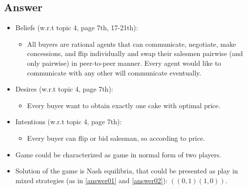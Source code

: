 \documentclass[
	a4paper, %
	11pt, %
]{CSUniSchoolLabReport}
\begin{document}
\subsection{Answer}\label{answer03}
\begin{itemize}
    \item Beliefs (w.r.t topic 4, page 7th, 17-21th):
    \begin{itemize}
        \item All buyers are rational agents that can communicate, negotiate, make concessions, and flip individually and swap their salesmen pairwise (and only pairwise) in peer-to-peer manner. Every agent would like to communicate with any other will communicate eventually.
    \end{itemize}
    \item Desires (w.r.t topic 4, page 7th):
    \begin{itemize}
        \item Every buyer want to obtain exactly one cake with optimal price.
    \end{itemize}
    \item Intentions (w.r.t topic 4, page 7th):
    \begin{itemize}
        \item Every buyer can flip or bid salesman, so according to price.
    \end{itemize}
    \item Game could be characterized as game in normal form of two players.
    \item Solution of the game is Nash equilibria, that could be presented as play in mixed strategies (as in \ref{answer01} and \ref{answer02}): $((0, 1)(1, 0))$.
\end{itemize}

\end{document}
